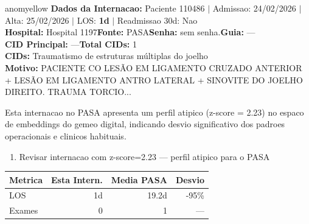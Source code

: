 \documentclass[a4paper,10pt]{article}
\begin{document}
\begin{anomalycard}[Internacao 184164 | PASA | MODERADO (z=2.23)]{anomyellow}
\textbf{Dados da Internacao:} Paciente 110486 $\mid$ Admissao: 24/02/2026 $\mid$ Alta: 25/02/2026 $\mid$ LOS: \textbf{1d} $\mid$ Readmissao 30d: Nao\\
\textbf{Hospital:} Hospital 1197\quad\textbf{Fonte:} PASA\quad\textbf{Senha:} sem senha.\quad\textbf{Guia:} ---\\
\textbf{CID Principal:} {\small ---}\quad\textbf{Total CIDs:} 1\\

\textbf{CIDs:} {\scriptsize Traumatismo de estruturas múltiplas do joelho}\\

\textbf{Motivo:} {\scriptsize PACIENTE CO LESÃO EM LIGAMENTO CRUZADO ANTERIOR + LESÃO EM LIGAMENTO ANTRO LATERAL + SINOVITE DO JOELHO DIREITO.   TRAUMA TORCIO...}\\

\vspace{2pt}\begin{tcolorbox}[colback=severityred!20,colframe=anomyellow,title={\textbf{Interpretacao de Negocio}},fonttitle=\bfseries\small,left=4pt,right=4pt,top=3pt,bottom=3pt]
{\small Esta internacao no PASA apresenta um perfil atipico (z-score = 2.23) no espaco de embeddings do gemeo digital, indicando desvio significativo dos padroes operacionais e clinicos habituais.}
\end{tcolorbox}
\begin{tcolorbox}[colback=severityyellow!30,colframe=anomorange,title={\textbf{Recomendacoes Especificas}},fonttitle=\bfseries\small,left=4pt,right=4pt,top=3pt,bottom=3pt]
\begin{enumerate}[nosep,leftmargin=16pt]
\item {\small Revisar internacao com z-score=2.23 --- perfil atipico para o PASA}
\end{enumerate}
\end{tcolorbox}
\begin{center}\begin{tabular}{l r r r}\toprule\textbf{Metrica} & \textbf{Esta Intern.} & \textbf{Media PASA} & \textbf{Desvio} \\\midrule
LOS & 1d & 19.2d & -95\% \\
Exames & 0 & 1 & --- \\
\bottomrule\end{tabular}\end{center}


\end{anomalycard}
\end{document}
